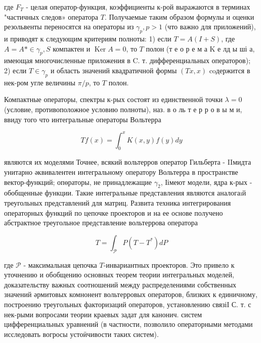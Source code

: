 \documentclass[10pt]{article}
\begin{document}
где $F_{T}$ - целая оператор-функция, коэффициенты к-рой выражаются в терминах "частичных следов» оператора $T$. Получаемые таким образом формулы и оценки резольвенты переносятся на операторы из $\gamma_{p}, p>1$ (что важно для приложений), и приводят к следующим критериям полноты: 1) если $T=A(I+S)$, где $A=A * \in \gamma_{p}, S$ компактен и $\operatorname{Ker} A=0$, то $T$ полон (т е о р е м а $\mathrm{K}$ е лд ы ші а, имеющая многочисленные приложения в C. т. дифференциальных операторов); 2) если $T \in \gamma_{p}$ и область значений квадратичной формы $(T x, x)$ coдержится в нек-ром угле величины $\pi / p$, то $T$ полон.



Компактные операторы, спектры к-рых состоят из единственной точки $\lambda=0$ (условие, противоположное условию полноты), наз. в о ль т е р р о в ы м и, ввиду того что интегральные операторы Вольтерра



\[

T f(x)=\int_{0}^{x} K(x, y) f(y) d y

\]



являются их моделями Точнее, всякий вольтерров оператор Гильберта - IIмидта унитарно әквивалентен интегральному оператору Вольтерра в пространстве вектор-функций; опөраторы, не принадлежащие $\gamma_{2}$, Іімеют модели, ядра к-рых - обобщенные функции. Такие интегральные представления являются аналогаıй треугольных представлений для матриц. Развита техника интегрирования операторных функций по цепочке проекторов и на ее основе получено абстрактное треугольное представление вольтеррова оператора



\[

T=\int_{\mathscr{P}} P\left(T-T^{*}\right) d P

\]



где $\mathscr{P}$ - максимальная цепочка $T$-инвариантных проекторов. Это привело к уточнению и обобщению основных теорем теории интегральных моделей, доказательству важных соотношений между распределениями собственных значений әрмитовых комнонент вольтерровых операторов, близких к единичному, построению треугольных факторизаций операторов, установлению связіІ С. т. с нек-рыми вопросами теории краевых задат для канонич. систем цифференциальных уравнений (в частности, позволило операторными методами исследовать вогросы устоӥчивости таких систем).
\end{document}
